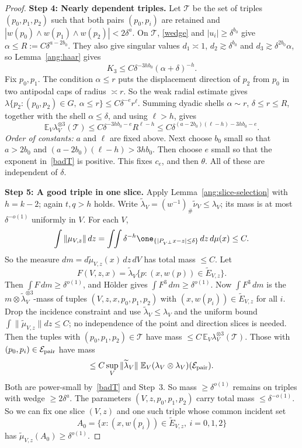 \begin{proof}
\textbf{Step 4: Nearly dependent triples.} Let $\mathcal T$ be the set of triples $(p_0,p_1,p_2)$ such that both pairs $(p_0,p_i)$ are retained and $|w(p_0)\wedge w(p_1)\wedge w(p_2)|<2\delta^a$. On $\mathcal T$, \eqref{wedge} and $|u_i|\ge\delta^{b_0}$ give $\alpha\le R:=C\delta^{a-2b_0}$. They also give singular values $d_1\asymp1$, $d_2\gtrsim\delta^{b_0}$ and $d_3\gtrsim\delta^{2b_0}\alpha$, so Lemma~\ref{ang:haar} gives
\[
K_3\le C\delta^{-3hb_0}(\alpha+\delta)^{-h}.
\]
Fix $p_0,p_1$. The condition $\alpha\le r$ puts the displacement direction of $p_2$ from $p_0$ in two antipodal caps of radius $\asymp r$. So the weak radial estimate gives $\lambda\{p_2:(p_0,p_2)\in G,\ \alpha\le r\}\le C\delta^{-e}r^\ell$. Summing dyadic shells $\alpha\sim r$, $\delta\le r\le R$, together with the shell $\alpha\le\delta$, and using $\ell>h$, gives
\begin{equation}\label{badT}
\mathbb E_V\lambda_V^{\otimes3}(\mathcal T)\le C\delta^{-3hb_0-e}R^{\ell-h}\le C\delta^{(a-2b_0)(\ell-h)-3hb_0-e}.
\end{equation}
\emph{Order of constants:} $a$ and $\ell$ are fixed above. Next choose $b_0$ small so that $a>2b_0$ and $(a-2b_0)(\ell-h)>3hb_0$. Then choose $e$ small so that the exponent in~\eqref{badT} is positive. This fixes $c_e$, and then $\theta$. All of these are independent of $\delta$.

\textbf{Step 5: A good triple in one slice.} Apply Lemma~\ref{ang:slice-selection} with $h=k-2$; again $t,q>h$ holds. Write $\widetilde\lambda_V=(w^{-1})_\#\widetilde\nu_V\le\lambda_V$; its mass is at most $\delta^{-o(1)}$ uniformly in $V$. For each $V$,
\[
\int\|\mu_{V,z}\|\,dz=\int\!\!\int\delta^{-h}\one_{\{|P_{V^\perp}x-z|\le\delta\}}\,dz\,d\mu(x)\le C .
\]
So the measure $dm=d\widetilde\mu_{V,z}(x)\,dz\,dV$ has total mass $\le C$. Let
\[
F(V,z,x)=\widetilde\lambda_V\{p:(x,w(p))\in\widetilde E_{V,z}\}.
\]
Then $\int F\,dm\ge\delta^{o(1)}$, and H\"older gives $\int F^3\,dm\ge\delta^{o(1)}$. Now $\int F^3\,dm$ is the $m\otimes\widetilde\lambda_V^{\otimes3}$-mass of tuples $(V,z,x,p_0,p_1,p_2)$ with $(x,w(p_i))\in\widetilde E_{V,z}$ for all $i$. Drop the incidence constraint and use $\widetilde\lambda_V\le\lambda_V$ and the uniform bound $\int\|\widetilde\mu_{V,z}\|dz\le C$; no independence of the point and direction slices is needed. Then the tuples with $(p_0,p_1,p_2)\in\mathcal T$ have mass $\le C\,\mathbb E_V\lambda_V^{\otimes3}(\mathcal T)$. Those with $(p_0,p_i)\in\mathcal E_{\rm pair}$ have mass
\[
\le C\sup_V\|\widetilde\lambda_V\|\;\mathbb E_V(\lambda_V\otimes\lambda_V)(\mathcal E_{\rm pair}).
\]
Both are power-small by~\eqref{badT} and Step~3. So mass $\ge\delta^{o(1)}$ remains on triples with wedge $\ge2\delta^a$. The parameters $(V,z,p_0,p_1,p_2)$ carry total mass $\le\delta^{-o(1)}$. So we can fix one slice $(V,z)$ and one such triple whose common incident set
\[
A_0=\{x:(x,w(p_i))\in\widetilde E_{V,z},\ i=0,1,2\}
\]
has $\widetilde\mu_{V,z}(A_0)\ge\delta^{o(1)}$.


\end{proof}
